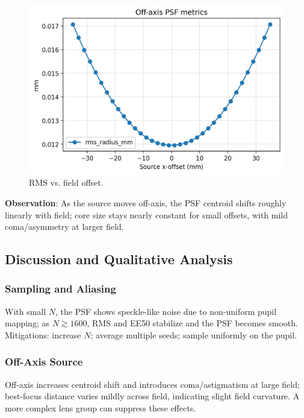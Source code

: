 \documentclass[11pt,a4paper]{article}
\begin{document}
	\begin{figure}[H]
		\centering
		\includegraphics[width=\linewidth]{offaxis/metrics_vs_x_off_mm.png}
		\caption{RMS vs. field offset.}
	\end{figure}
	
	\textbf{Observation}: As the source moves off-axis, the PSF centroid shifts roughly linearly with field; core size stays nearly constant for small offsets, with mild coma/asymmetry at larger field.
	
	\subsection{Discussion and Qualitative Analysis}\label{discussion}
	
	\subsubsection*{Sampling and Aliasing}
	
	With small \(N\), the PSF shows speckle-like noise due to non-uniform pupil mapping; as \(N \gtrsim 1600\), RMS and EE50 stabilize and the PSF becomes smooth.
	Mitigations: increase \(N\); average multiple seeds; sample uniformly on the pupil.
	
	\subsubsection*{Off-Axis Source}
	
	Off-axis increases centroid shift and introduces coma/astigmatism at large field; best-focus distance varies mildly across field, indicating slight field curvature.
	A more complex lens group can suppress these effects.
	
\end{document}
